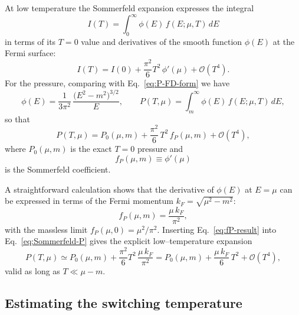 \documentclass[superscriptaddress,amsmath,floatfix,aps,prc,twocolumn]{revtex4-1}
\begin{document}
At low temperature the Sommerfeld expansion expresses the integral
\begin{equation}
I(T) = \int_0^\infty \phi(E)\, f(E;\mu,T)\, dE
\end{equation}
in terms of its $T=0$ value and derivatives of the smooth function
$\phi(E)$ at the Fermi surface:
\begin{equation}
I(T) = I(0) + \frac{\pi^2}{6}T^2\,\phi'(\mu) + \mathcal{O}(T^4).
\end{equation}
For the pressure, comparing with Eq.~\eqref{eq:P-FD-form} we have
\begin{equation}
\phi(E)
= \frac{1}{3\pi^2}\,\frac{\bigl(E^2-m^2\bigr)^{3/2}}{E},
\qquad
P(T,\mu) = \int_m^\infty \phi(E)\, f(E;\mu,T)\, dE,
\end{equation}
so that
\begin{equation}
P(T,\mu)
= P_0(\mu,m) + \frac{\pi^2}{6}\,T^2\, f_P(\mu,m)
  + \mathcal{O}(T^4),
\label{eq:Sommerfeld-P}
\end{equation}
where $P_0(\mu,m)$ is the exact $T=0$ pressure and
\begin{equation}
f_P(\mu,m) \equiv \phi'(\mu)
\end{equation}
is the Sommerfeld coefficient.

A straightforward calculation shows that the derivative of
$\phi(E)$ at $E=\mu$ can be expressed in terms of the Fermi momentum
$k_F = \sqrt{\mu^2 - m^2}$:
\begin{equation}
f_P(\mu,m)
 = \frac{\mu\,k_F}{\pi^2},
\label{eq:fP-result}
\end{equation}
with the massless limit
$f_P(\mu,0)=\mu^2/\pi^2$.
Inserting Eq.~\eqref{eq:fP-result} into Eq.~\eqref{eq:Sommerfeld-P}
gives the explicit low--temperature expansion
\begin{equation}
P(T,\mu)
\simeq
P_0(\mu,m)
+ \frac{\pi^2}{6}T^2\,\frac{\mu\,k_F}{\pi^2}
= P_0(\mu,m) + \frac{\mu\,k_F}{6}\,T^2
+ \mathcal{O}(T^4),
\end{equation}
valid as long as $T \ll \mu-m$.

\subsection*{Estimating the switching temperature}
\end{document}
